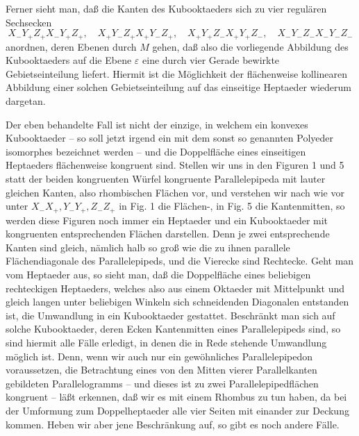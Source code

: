 \documentclass[11pt,a4paper]{article}
\begin{document}
Ferner sieht man, da\ss{} die Kanten des Kubooktaeders sich zu vier regul\"aren Sechsecken
\[
X_-Y_+Z_+X_-Y_+Z_+,
\quad X_+Y_-Z_+X_+Y_-Z_+,
\quad X_+Y_+Z_-X_+Y_+Z_-,
\quad X_-Y_-Z_-X_-Y_-Z_-
\]
anordnen, deren Ebenen durch $M$ gehen, da\ss{} also die vorliegende Abbildung des Kubooktaeders auf die Ebene $\varepsilon$ eine durch vier Gerade bewirkte Gebietseinteilung liefert. Hiermit ist die M\"oglichkeit der fl\"achenweise kollinearen Abbildung einer solchen Gebietseinteilung auf das einseitige Heptaeder wiederum dargetan.

Der eben behandelte Fall ist nicht der einzige, in welchem ein konvexes Kubooktaeder -- so soll jetzt irgend ein mit dem sonst so genannten Polyeder isomorphes bezeichnet werden -- und die Doppelfl\"ache eines einseitigen Heptaeders fl\"achenweise kongruent sind. Stellen wir uns in den Figuren 1 und 5 statt der beiden kongruenten W\"urfel kongruente Parallelepipeda mit lauter gleichen Kanten, also rhombischen Fl\"achen vor, und verstehen wir nach wie vor unter $X_-X_+,Y_-Y_+,Z_-Z_+$ in Fig. 1 die Fl\"achen-, in Fig. 5 die Kantenmitten, so werden diese Figuren noch immer ein Heptaeder und ein Kubooktaeder mit kongruenten entsprechenden Fl\"achen darstellen. Denn je zwei entsprechende Kanten sind gleich, n\"amlich halb so gro\ss{} wie die zu ihnen parallele Fl\"achendiagonale des Parallelepipeds, und die Vierecke sind Rechtecke. Geht man vom Heptaeder aus, so sieht man, da\ss{} die Doppelfl\"ache eines beliebigen rechteckigen Heptaeders, welches also aus einem Oktaeder mit Mittelpunkt und gleich langen unter beliebigen Winkeln sich schneidenden Diagonalen entstanden ist, die Umwandlung in ein Kubooktaeder gestattet. Beschr\"ankt man sich auf solche Kubooktaeder, deren Ecken Kantenmitten eines Parallelepipeds sind, so sind hiermit alle F\"alle erledigt, in denen die in Rede stehende Umwandlung m\"oglich ist. Denn, wenn wir auch nur ein gew\"ohnliches Parallelepipedon voraussetzen, die Betrachtung eines von den Mitten vierer Parallelkanten gebildeten Parallelogramms -- und dieses ist zu zwei Parallelepipedfl\"achen kongruent -- l\"a\ss{}t erkennen, da\ss{} wir es mit einem Rhombus zu tun haben, da bei der Umformung zum Doppelheptaeder alle vier Seiten mit einander zur Deckung kommen. Heben wir aber jene Beschr\"ankung auf, so gibt es noch andere F\"alle.
\end{document}
